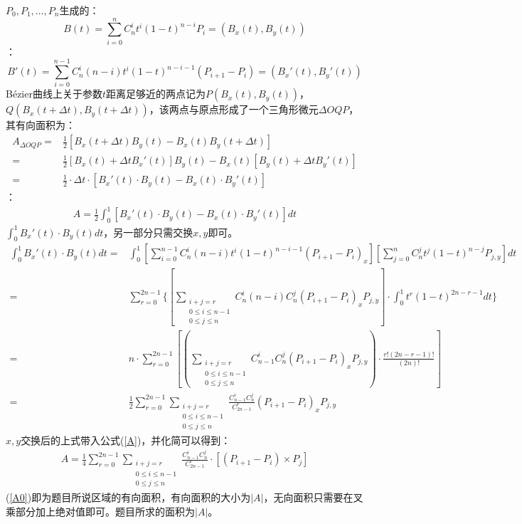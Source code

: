 \documentclass{article}
\newcommand{\Bezier}{B\'ezier}%
\begin{document}
	$P_0,P_1,\dots,P_n$生成的：
	$$B(t)=\sum_{i=0}^{n}C_n^it^i(1-t)^{n-i}P_i=(B_x(t),B_y(t))$$
	：
	$$B'(t)=\sum_{i=0}^{n-1}C_n^i(n-i)t^i(1-t)^{n-i-1}(P_{i+1}-P_i)=(B_x'(t),B_y'(t))$$
	\qquad Bézier曲线上关于参数$t$距离足够近的两点记为$P(B_x(t),B_y(t))$，\\$Q(B_x(t+\Delta t),B_y(t+\Delta t))$，该两点与原点形成了一个三角形微元$\Delta OQP$，其有向面积为：
	\begin{equation*}
		\begin{aligned}
			A_{\Delta OQP}=&\frac{1}{2}[B_x(t+\Delta t)B_y(t)-B_x(t)B_y(t+\Delta t)]\\
			=&\frac{1}{2}[B_x(t)+\Delta tB_x'(t)]B_y(t)-B_x(t)[B_y(t)+\Delta tB_y'(t)]\\
			=&\frac{1}{2}\cdot\Delta t\cdot [B_x'(t)\cdot B_y(t)-B_x(t)\cdot B_y'(t)]
		\end{aligned}
	\end{equation*}
	：
	\begin{equation}
		\label{A}
		\begin{aligned}
			A=\frac{1}{2}\int_{0}^{1}[B_x'(t)\cdot B_y(t)-B_x(t)\cdot B_y'(t)]dt
		\end{aligned}
	\end{equation}
	$\int_{0}^{1}B_x'(t)\cdot B_y(t)dt$，另一部分只需交换$x,y$即可。
	\begin{equation*}
		\begin{aligned}
			\int_{0}^{1}B_x'(t)\cdot B_y(t)dt=&\int_{0}^{1}[\sum_{i=0}^{n-1}C_n^i(n-i)t^i(1-t)^{n-i-1}(P_{i+1}-P_i)_x][\sum_{j=0}^{n}C_n^jt^j(1-t)^{n-j}P_{j,y}]dt\\
			=&\sum_{r=0}^{2n-1}\{[\sum_{\substack{i+j=r\\0\leq i\leq n-1\\0\leq j\leq n}}C_n^i(n-i)C_n^j(P_{i+1}-P_i)_xP_{j,y}]\cdot\int_{0}^{1}t^r(1-t)^{2n-r-1}dt\}\\
			=&n\cdot \sum_{r=0}^{2n-1} [(\sum_{\substack{i+j=r\\0\leq i\leq n-1\\0\leq j\leq n}}C_{n-1}^iC_{n}^j (P_{i+1}-P_i)_xP_{j,y})\cdot\frac{r!(2n-r-1)!}{(2n)!} ]\\
			=&\frac{1}{2}\sum_{r=0}^{2n-1} \sum_{\substack{i+j=r\\0\leq i\leq n-1\\0\leq j\leq n}}\frac{C_{n-1}^iC_{n}^j}{C_{2n-1}^r} (P_{i+1}-P_i)_xP_{j,y}
		\end{aligned}
	\end{equation*}
	$x,y$交换后的上式带入公式(\ref{A})，并化简可以得到：
	\begin{equation}
		\label{A0}
		\begin{aligned}
			A=\frac{1}{4}\sum_{r=0}^{2n-1} \sum_{\substack{i+j=r\\0\leq i\leq n-1\\0\leq j\leq n}}\frac{C_{n-1}^iC_n^j}{C_{2n-1}^r}\cdot [(P_{i+1}-P_i)\times P_j]
		\end{aligned}
	\end{equation}
	(\ref{A0})即为题目所说区域的有向面积，有向面积的大小为$|A|$，无向面积只需要在叉乘部分加上绝对值即可。题目所求的面积为$|A|$。
	
	
	
\end{document}

